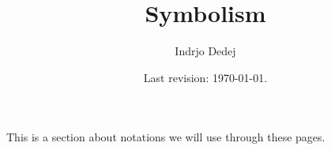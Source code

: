 




\title{Symbolism}
\author{Indrjo Dedej}
\date{Last revision: \today{}.}



\maketitle

\tableofcontents

This is a section about notations we will use through these pages.




